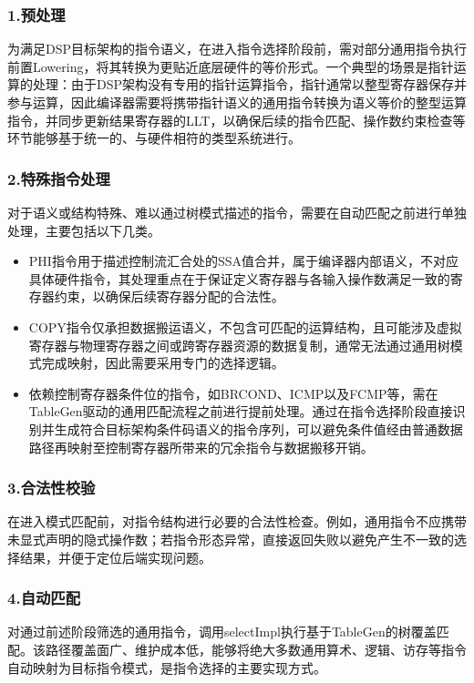 \subsubsection{1.预处理}
为满足DSP目标架构的指令语义，在进入指令选择阶段前，需对部分通用指令执行前置Lowering，将其转换为更贴近底层硬件的等价形式。一个典型的场景是指针运算的处理：由于DSP架构没有专用的指针运算指令，指针通常以整型寄存器保存并参与运算，因此编译器需要将携带指针语义的通用指令转换为语义等价的整型运算指令，并同步更新结果寄存器的LLT，以确保后续的指令匹配、操作数约束检查等环节能够基于统一的、与硬件相符的类型系统进行。


\subsubsection{2.特殊指令处理}
对于语义或结构特殊、难以通过树模式描述的指令，需要在自动匹配之前进行单独处理，主要包括以下几类。

\begin{itemize}
	\item
	PHI指令用于描述控制流汇合处的SSA值合并，属于编译器内部语义，不对应具体硬件指令，其处理重点在于保证定义寄存器与各输入操作数满足一致的寄存器约束，以确保后续寄存器分配的合法性。

	\item
	COPY指令仅承担数据搬运语义，不包含可匹配的运算结构，且可能涉及虚拟寄存器与物理寄存器之间或跨寄存器资源的数据复制，通常无法通过通用树模式完成映射，因此需要采用专门的选择逻辑。

	\item 
	依赖控制寄存器条件位的指令，如BRCOND、ICMP以及FCMP等，需在TableGen驱动的通用匹配流程之前进行提前处理。通过在指令选择阶段直接识别并生成符合目标架构条件码语义的指令序列，可以避免条件值经由普通数据路径再映射至控制寄存器所带来的冗余指令与数据搬移开销。
	
\end{itemize}


\subsubsection{3.合法性校验}
在进入模式匹配前，对指令结构进行必要的合法性检查。例如，通用指令不应携带未显式声明的隐式操作数；若指令形态异常，直接返回失败以避免产生不一致的选择结果，并便于定位后端实现问题。


\subsubsection{4.自动匹配}
对通过前述阶段筛选的通用指令，调用selectImpl执行基于TableGen的树覆盖匹配。该路径覆盖面广、维护成本低，能够将绝大多数通用算术、逻辑、访存等指令自动映射为目标指令模式，是指令选择的主要实现方式。

